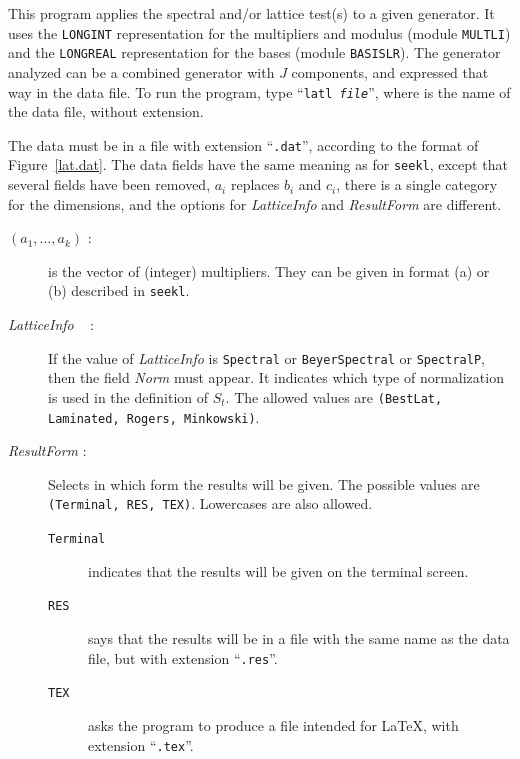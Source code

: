 
This program applies the spectral and/or lattice test(s) to a given
generator.  It uses the {\tt LONGINT} representation for the multipliers
and modulus (module {\tt MULTLI}) and the {\tt LONGREAL} representation
for the bases (module {\tt BASISLR}).
The generator analyzed can be a combined generator with $J$ components,
and expressed that way in the data file.
%
To run the program, type ``{\tt latl \<\em file\>}'', where \> is
the name of the data file, without extension.

The data must be in a file with extension
``{\tt .dat}'', according to the format of Figure~\ref{lat.dat}.
The data fields have the same meaning as for {\tt seekl},
except that several fields have been removed, 
$a_i$ replaces $b_i$ and $c_i$,
there is a single category for the dimensions, 
and the options for {\em LatticeInfo} and {\em ResultForm\/} are different.
\begin {description}
\item [$(a_1,\ldots,a_k)$ :] is the vector of (integer) multipliers.
  They can be given in format (a) or (b) described in {\tt seekl}.
\item [{\em LatticeInfo} ~\> :]
  If the value of {\em LatticeInfo} is {\tt Spectral} 
  or {\tt BeyerSpectral} or {\tt SpectralP},
  then the field {\em Norm\/} must appear.
  It indicates which type of normalization is used
  in the definition of $S_t$.
  The allowed values are {\tt (BestLat, Laminated, Rogers, Minkowski)}.
\item [{\em ResultForm} :]
  Selects in which form the results will be given.
  The possible values are {\tt (Terminal, RES, TEX)}.
  Lowercases are also allowed.
  \begin {description}
   \item [{\tt Terminal}] indicates that the results will be given on the
     terminal screen.
   \item [{\tt RES}] says that the results will be in a file with the same
     name as the data file, but with extension ``{\tt .res}''.
   \item [{\tt TEX}] asks the program to produce a file intended for
     \LaTeX, with extension ``{\tt .tex}''.
  \end {description}
\end {description}

